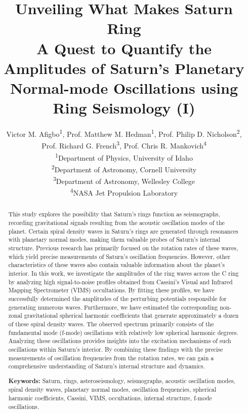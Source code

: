 \documentclass{article}
\title{Unveiling What Makes Saturn Ring \\[0.5ex] \large A Quest to Quantify the Amplitudes of Saturn's Planetary Normal-mode Oscillations using Ring Seismology (I)}
\author{Victor M. Afigbo\textsuperscript{1}, Prof. Matthew M. Hedman\textsuperscript{1}, Prof. Philip D. Nicholson\textsuperscript{2}, \\
Prof. Richard G. French\textsuperscript{3}, Prof. Chris R. Mankovich\textsuperscript{4}\\
\small\textsuperscript{1}Department of Physics, University of Idaho \\
\small\textsuperscript{2}Department of Astronomy, Cornell University\\
\small\textsuperscript{3}Department of Astronomy, Wellesley College\\
\small\textsuperscript{4}NASA Jet Propulsion Laboratory}
\begin{document}
\maketitle

\begin{abstract}
This study explores the possibility that Saturn's rings function as seismographs, recording gravitational signals resulting from the acoustic oscillation modes of the planet. Certain spiral density waves in Saturn's rings are generated through resonances with planetary normal modes, making them valuable probes of Saturn's internal structure. Previous research has primarily focused on the rotation rates of these waves, which yield precise measurements of Saturn's oscillation frequencies. However, other characteristics of these waves also contain valuable information about the planet's interior. In this work, we investigate the amplitudes of the ring waves across the C ring by analyzing high signal-to-noise profiles obtained from Cassini's Visual and Infrared Mapping Spectrometer (VIMS) occultations. By fitting these profiles, we have successfully determined the amplitudes of the perturbing potentials responsible for generating numerous waves. Furthermore, we have estimated the corresponding non-zonal gravitational spherical harmonic coefficients that generate approximately a dozen of these spiral density waves. The observed spectrum primarily consists of the fundamental mode (f-mode) oscillations with relatively low spherical harmonic degrees. Analyzing these oscillations provides insights into the excitation mechanisms of such oscillations within Saturn's interior. By combining these findings with the precise measurements of oscillation frequencies from the rotation rates, we can gain a comprehensive understanding of Saturn's internal structure and dynamics.

\vspace{0.3cm}

\textbf{Keywords:} Saturn, rings, asteroseismology, seismographs, acoustic oscillation modes, spiral density waves, planetary normal modes, oscillation frequencies, spherical harmonic coefficients, Cassini, VIMS, occultations, internal structure, f-mode oscillations.

\end{abstract}

\end{document}
